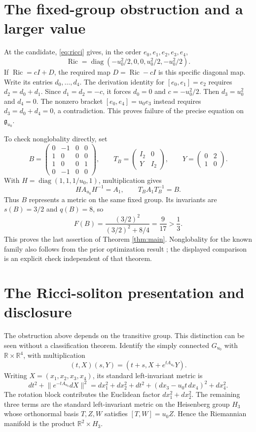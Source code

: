 \documentclass[11pt]{article}
\newcommand{\R}{\mathbb R}
\newcommand{\Ric}{\operatorname{Ric}}
\newcommand{\norm}[1]{\lVert #1\rVert}
\begin{document}
\section{The fixed-group obstruction and a larger value}

At the candidate, \eqref{eq:ricci} gives, in the order
\(e_0,e_1,e_2,e_3,e_4\),
\begin{equation}\label{eq:riccandidate}
 \Ric=\operatorname{diag}(-u_0^2/2,0,0,u_0^2/2,-u_0^2/2).
\end{equation}
If \(\Ric=cI+D\), the required map \(D=\Ric-cI\) is this specific
diagonal map. Write its entries \(d_0,\ldots,d_4\).
The derivation identity for \([e_0,e_1]=e_2\) requires
\(d_2=d_0+d_1\). Since \(d_1=d_2=-c\), it forces \(d_0=0\)
and \(c=-u_0^2/2\). Then \(d_3=u_0^2\) and \(d_4=0\).
The nonzero bracket \([e_0,e_4]=u_0e_3\) instead requires
\(d_3=d_0+d_4=0\), a contradiction.
This proves failure of the precise equation on \(\mathfrak g_{u_0}\).

To check nonglobality directly, set
\[
 B=\begin{pmatrix}
 0&-1&0&0\\1&0&0&0\\1&0&0&1\\0&-1&0&0
 \end{pmatrix},\qquad
 T_B=\begin{pmatrix}I_2&0\\Y&I_2\end{pmatrix},
 \qquad Y=\begin{pmatrix}0&2\\1&0\end{pmatrix}.
\]
With \(H=\operatorname{diag}(1,1,1/u_0,1)\), multiplication gives
\[
 HA_{u_0}H^{-1}=A_1,\qquad
 T_BA_1T_B^{-1}=B.
\]
Thus \(B\) represents a metric on the same fixed group.
Its invariants are \(s(B)=3/2\) and \(q(B)=8\), so
\[
 F(B)=\frac{(3/2)^2}{(3/2)^2+8/4}=\frac9{17}>\frac13.
\]
This proves the last assertion of Theorem \ref{thm:main}.
Nonglobality for the known family also follows from the prior
optimization result \cite[Theorem 6.5(iii)]{LWv2};
the displayed comparison is an explicit check independent of that theorem.

\section{The Ricci-soliton presentation and disclosure}
\label{sec:presentation}

The obstruction above depends on the transitive group.
This distinction can be seen without a classification theorem.
Identify the simply connected \(G_{u_0}\) with \(\R\times\R^4\),
with multiplication
\[
 (t,X)(s,Y)=(t+s,X+e^{tA_{u_0}}Y).
\]
Writing \(X=(x_1,x_2,x_3,x_4)\), its standard left-invariant metric is
\[
 dt^2+\norm{e^{-tA_{u_0}}dX}^2
 =dx_1^2+dx_2^2+dt^2+(dx_3-u_0t\,dx_4)^2+dx_4^2.
\]
The rotation block contributes the Euclidean factor
\(dx_1^2+dx_2^2\). The remaining three terms are the
standard left-invariant metric on the Heisenberg group \(H_3\)
whose orthonormal basis \(T,Z,W\) satisfies
\([T,W]=u_0Z\). Hence the Riemannian manifold is the product
\(\R^2\times H_3\).
\end{document}
